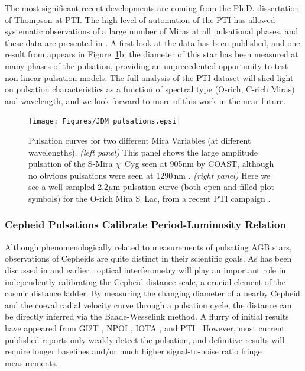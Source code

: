 \documentclass[12pt]{iopart}
\begin{document}
The most significant recent developments are coming from the Ph.D.
dissertation of Thompson at PTI.  The high level of automation of the
PTI has allowed systematic observations of a large number of Miras at
all pulsational phases, and these data are presented in
\citet{thompsonthesis}.  A first look at the data has been published,
and one result from \citet{thompson2002a} appears in
Figure~\ref{pulsations}b; the diameter of this star has been measured
at many phases of the pulsation, providing an unprecedented
opportunity to test non-linear pulsation models.  The full analysis of
the PTI dataset will shed light on pulsation characteristics as a
function of spectral type (O-rich, C-rich Miras) and wavelength, and
we look forward to more of this work in the near future.

\begin{figure}[tbhp]
\begin{center}
\texttt{[image: Figures/JDM\_pulsations.epsi]}
\caption{\footnotesize Pulsation curves for two different
  Mira Variables (at different wavelengths).  {\em (left panel)} This
  panel shows the large amplitude pulsation of the S-Mira $\chi$~Cyg
  seen at 905nm by COAST, although no obvious pulsations were seen at
  1290\,nm \citep[see Figure~2a in][reproduced here with permission of
  Blackwell Publishing]{young2000a}.  {\em (right panel)} Here we see
  a well-sampled 2.2$\mu$m pulsation curve (both open and filled
  plot symbols) for the O-rich Mira S~Lac, from a recent PTI campaign
  \citep[see Figure~2 in][reproduced with permission of the
  AAS]{thompson2002a}.
\label{pulsations}}
\end{center}
\end{figure}


\subsubsection{Cepheid Pulsations Calibrate Period-Luminosity Relation}
Although phenomenologically related to measurements of pulsating AGB
stars, observations of Cepheids are quite distinct in their scientific
goals.  As has been discussed in \citet{sasselov1994} and earlier
\citep[e.g.,][]{davis1976}, optical interferometry will play an
important role in independently calibrating the Cepheid distance
scale, a crucial element of the cosmic distance ladder.  By measuring
the changing diameter of a nearby Cepheid and the coeval radial
velocity curve through a pulsation cycle, the distance can be directly
inferred via the Baade-Wesselink method.  A flurry of initial results
have appeared from GI2T \citep{mourard1997}, NPOI
\citep{armstrong2001}, IOTA \citep{kervella2001}, and PTI \citep[the
first definitive detection of Cepheid pulsation;][]{lane2000}.
However, most current published reports only weakly detect the
pulsation, and definitive results will require longer baselines and/or
much higher signal-to-noise ratio fringe measurements.
\end{document}
